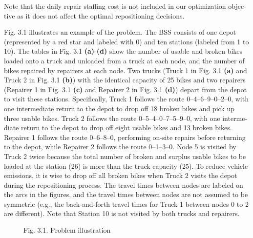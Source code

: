 \documentclass[
  english,
]{article}
\begin{document}
\begin{otherlanguage}{english}
\protect{}\label{p0170}
Note that the daily repair staffing cost is not included in our optimization objective as it does
not affect the optimal repositioning decisions.

\protect{}\label{p0175}
Fig. 3.1 illustrates an example of the problem. The BSS consists of one depot (represented by a red
star and labeled with 0) and ten stations (labeled from 1 to 10). The tables in Fig. 3.1
\textbf{(a)}-\textbf{(d)} show the number of usable and broken bikes loaded onto a truck and
unloaded from a truck at each node, and the number of bikes repaired by repairers at each node. Two
trucks (Truck 1 in Fig. 3.1 \textbf{(a)} and Truck 2 in Fig. 3.1 \textbf{(b)}) with the identical
capacity of 25 bikes and two repairers (Repairer 1 in Fig. 3.1 \textbf{(c)} and Repairer 2 in Fig.
3.1 \textbf{(d)}) depart from the depot to visit these stations. Specifically, Truck 1 follows the
route 0--4--6--9--0--2--0, with one intermediate return to the depot to drop off 18 broken bikes and
pick up three usable bikes. Truck 2 follows the route 0--5--4--0--7--5--9--0, with one intermediate
return to the depot to drop off eight usable bikes and 13 broken bikes. Repairer 1 follows the route
0--6--8--0, performing on-site repairs before returning to the depot, while Repairer 2 follows the
route 0--1--3--0. Node 5 is visited by Truck 2 twice because the total number of broken and surplus
usable bikes to be loaded at the station (26) is more than the truck capacity (25). To reduce
vehicle emissions, it is wise to drop off all broken bikes when Truck 2 visits the depot during the
repositioning process. The travel times between nodes are labeled on the arcs in the figures, and
the travel times between nodes are not assumed to be symmetric (e.g., the back-and-forth travel
times for Truck 1 between nodes 0 to 2 are different). Note that Station 10 is not visited by both
trucks and repairers.

\begin{figure}
\centering
Fig. 3.1. Problem illustration
\caption{}\label{f0005}
\end{figure}


\end{otherlanguage}
\end{document}
